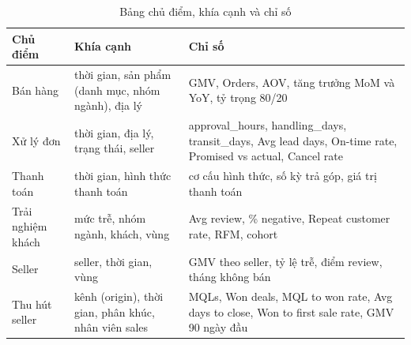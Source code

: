 \begin{table}[htbp]\centering\scriptsize\caption{Bảng chủ điểm, khía cạnh và chỉ số}\label{tab:chu-diem-khia-canh}
\begin{tabular}{p{2.47cm}p{4.75cm}p{7.22cm}}\toprule
\textbf{Chủ điểm} & \textbf{Khía cạnh} & \textbf{Chỉ số}\\\midrule
Bán hàng & thời gian, sản phẩm (danh mục, nhóm ngành), địa lý & GMV, Orders, AOV, tăng trưởng MoM và YoY, tỷ trọng 80/20\\
Xử lý đơn & thời gian, địa lý, trạng thái, seller & approval\_hours, handling\_days, transit\_days, Avg lead days, On-time rate, Promised vs actual, Cancel rate\\
Thanh toán & thời gian, hình thức thanh toán & cơ cấu hình thức, số kỳ trả góp, giá trị thanh toán\\
Trải nghiệm khách & mức trễ, nhóm ngành, khách, vùng & Avg review, \% negative, Repeat customer rate, RFM, cohort\\
Seller & seller, thời gian, vùng & GMV theo seller, tỷ lệ trễ, điểm review, tháng không bán\\
Thu hút seller & kênh (origin), thời gian, phân khúc, nhân viên sales & MQLs, Won deals, MQL to won rate, Avg days to close, Won to first sale rate, GMV 90 ngày đầu\\
\bottomrule\end{tabular}\end{table}
